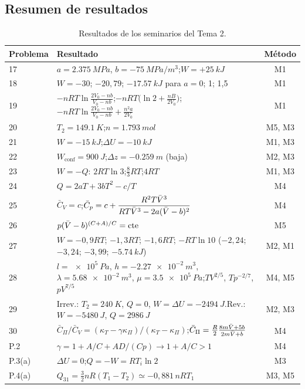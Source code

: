 \subsection{Resumen de resultados}
\begin{table}[H]
\centering
\caption{Resultados de los seminarios del Tema 2.}
\small
\renewcommand{\arraystretch}{1.3}
\begin{tabularx}{\textwidth}{lXc}
\toprule
Problema & Resultado & Método\\
\midrule
17 & $a=\SI{2,375}{MPa}$, $b=-\SI{75}{MPa/m^3}$;\enspace $W=+\SI{25}{kJ}$ & M1\\
18 & $W=-30$; $-20{,}79$; $-\SI{17,57}{kJ}$ para $a=0$; 1; 1,5 & M1\\
19 & $-nRT\ln\frac{2V_0-nb}{V_0-nb}$;\enspace $-nRT\bigl(\ln2+\frac{nB}{2V_0}\bigr)$;\enspace $-nRT\ln\frac{2V_0-nb}{V_0-nb}+\frac{n^2a}{2V_0}$ & M1\\
20 & $T_2=\SI{149,1}{K}$;\enspace $n=\SI{1,793}{mol}$ & M5, M3\\
21 & $W=-\SI{15}{kJ}$;\enspace $\Delta U=-\SI{10}{kJ}$ & M1, M3\\
22 & $W_{\mathrm{conf}}=\SI{900}{J}$;\enspace $\Delta z=-\SI{0,259}{m}$ (baja) & M2, M3\\
23 & $W=-Q$: $2RT\ln3$;\enspace $\tfrac83RT$;\enspace $4RT$ & M1, M3\\
24 & $Q=2aT+3bT^2-c/T$ & M4\\
25 & $\bar C_V=c$;\enspace $\bar C_p=c+\dfrac{R^2T\bar{V}^3}{RT\bar{V}^3-2a(\bar{V}-b)^2}$ & M4\\
26 & $p(\bar{V}-b)^{(C+A)/C}=\mathrm{cte}$ & M5\\
27 & $W=-0{,}9RT$; $-1{,}3RT$; $-1{,}6RT$; $-RT\ln10$ ($-2{,}24$; $-3{,}24$; $-3{,}99$; $-\SI{5,74}{kJ}$) & M2, M1\\
28 & $l=\SI{e5}{Pa}$, $h=-\SI{2,27e-2}{m^3}$, $\lambda=\SI{5,68e-2}{m^3}$, $\mu=\SI{3,5e5}{Pa}$;\enspace $TV^{2/5}$, $Tp^{-2/7}$, $pV^{7/5}$ & M4, M5\\
29 & Irrev.: $T_2=\SI{240}{K}$, $Q=0$, $W=\Delta U=-\SI{2494}{J}$.\enspace Rev.: $W=-\SI{5480}{J}$, $Q=\SI{2986}{J}$ & M2, M3\\
30 & $\bar C_\Pi/\bar C_V=(\kappa_T-\gamma\kappa_\Pi)/(\kappa_T-\kappa_\Pi)$;\enspace $\bar C_\Pi=\frac R2\frac{8m\bar{V}+5b}{2m\bar{V}+b}$ & M4\\
P.2 & $\gamma=1+A/C+AD/(Cp)\to1+A/C>1$ & M4\\
P.3(a) & $\Delta U=0$;\enspace $Q=-W=RT_i\ln2$ & M3\\
P.4(a) & $Q_{31}=\tfrac32nR(T_1-T_2)\simeq-0{,}881\,nRT_1$ & M3, M5\\
\bottomrule
\end{tabularx}
\end{table}

